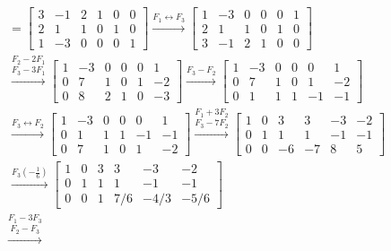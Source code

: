 \begin{enumerate}[topsep=6pt,itemsep=.4cm]
\begin{align*}
    [A|\operatornamewithlimits{Id}] &= 
    \left[\begin{array}{ccc|ccc}3 & -1 & 2 &1 &0 & 0\\2 & 1 & 1& 0 &1 &0 \\1&-3&0 &0 &0 &1\end{array}\right]
    \stackrel{F_1 \leftrightarrow F_3}{\longrightarrow}
    \left[\begin{array}{ccc|ccc}1&-3&0 &0 &0 &1\\2 & 1 & 1& 0 &1 &0 \\3 & -1 & 2 &1 &0 & 0\end{array}\right] \\
    &\stackrel{F_2 - 2 F_1}{\stackrel{F_3 - 3 F_1}{\longrightarrow}}
    \left[\begin{array}{ccc|ccc} 1 & -3 & 0  &0 &0 &1\\ 0 & 7 & 1 & 0 &1 &-2 \\ 0 & 8 & 2  &1 &0 & -3\end{array}\right]
    \stackrel{F_3-F_2}{\longrightarrow}
    \left[\begin{array}{ccc|ccc} 1 & -3 & 0  &0 &0 &1\\ 0 & 7 & 1 & 0 &1 &-2 \\  0 & 1 & 1   &1 &-1 & -1\end{array}\right]\\
    &\stackrel{F_3 \leftrightarrow F_2}{\longrightarrow} 
    \left[\begin{array}{ccc|ccc} 1 & -3 & 0  &0 &0 &1\\  0 & 1 & 1   &1 &-1 & -1\\ 0 & 7 & 1 & 0 &1 &-2 \end{array}\right]
    \stackrel{F_1 + 3 F_2}{\stackrel{F_3-7F_2}{\longrightarrow}}
    \left[\begin{array}{ccc|ccc} 1 & 0 & 3 &3 & -3 &-2\\ 0 & 1 & 1  &1 &-1 & -1\\ 0 & 0 & -6 &-7&8&5\end{array}\right] \\
    &\stackrel{F_3 (-\frac{1}{6}) }{\longrightarrow}
    \left[\begin{array}{ccc|ccc} 1 & 0 & 3 &3 & -3 &-2\\ 0 & 1 & 1  &1 &-1 & -1\\ 0 & 0 & 1 &7/6&-4/3&-5/6\end{array}\right]\\
    &\stackrel{F_1 - 3 F_3}{\stackrel{F_2 - F_3 }{\longrightarrow}}

\end{align*}
\end{enumerate}
